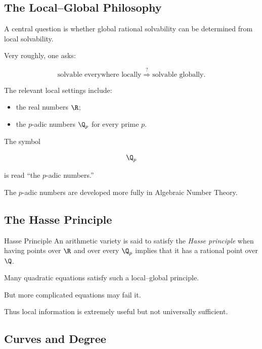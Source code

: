 \subsection{The Local--Global Philosophy}
\label{subsec:local-global-philosophy}

A central question is whether global rational solvability can be determined
from local solvability.

Very roughly, one asks:

\[
\boxed{
\text{solvable everywhere locally}
\stackrel{?}{\Longrightarrow}
\text{solvable globally}.
}
\]

The relevant local settings include:

\begin{itemize}
    \item the real numbers \(\R\);
    \item the \(p\)-adic numbers \(\Q_p\) for every prime \(p\).
\end{itemize}

The symbol

\[ \Q_p \]

is read ``the \(p\)-adic numbers.''

The \(p\)-adic numbers are developed more fully in Algebraic Number Theory.

\subsection{The Hasse Principle}
\label{subsec:hasse-principle}

\begin{definitionbox}{Hasse Principle}
An arithmetic variety is said to satisfy the \emph{Hasse principle} when
having points over \(\R\) and over every \(\Q_p\) implies that it has a
rational point over \(\Q\).
\end{definitionbox}

Many quadratic equations satisfy such a local--global principle.

But more complicated equations may fail it.

Thus local information is extremely useful but not universally sufficient.

\subsection{Curves and Degree}
\label{subsec:curves-degree-diophantine}

